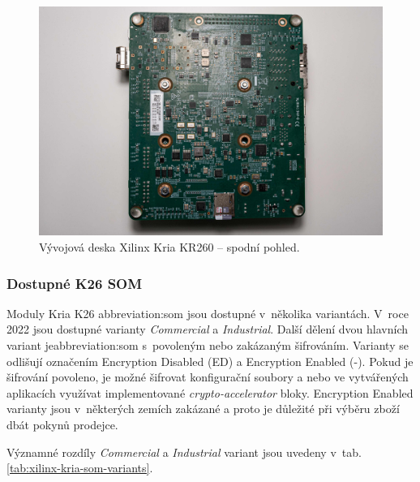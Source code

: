 \documentclass[a4paper, twoside, 11pt]{article}
\begin{document}
				\begin{figure}[H]
					\centering
						\includegraphics[width=1\textwidth]{src/jpg/xilinx-kria-foto-3.jpeg} 
						\caption{Vývojová deska Xilinx Kria KR260 – spodní pohled.}
						\label{fig:xilinx-kria-foto-3}
				\end{figure}
			
			
				\subsubsection{Dostupné K26 SOM}
					Moduly Kria K26 \gls{abbreviation:som} jsou dostupné v~několika variantách. V~roce 2022 jsou dostupné varianty \textit{Commercial} a \textit{Industrial}. Další dělení dvou hlavních variant je\gls{abbreviation:som} s~povoleným nebo zakázaným šifrováním. Varianty se odlišují označením Encryption Disabled (ED) a Encryption Enabled (-). Pokud je šifrování povoleno, je možné šifrovat konfigurační soubory a nebo ve vytvářených aplikacích využívat implementované \textit{crypto-accelerator} bloky. Encryption Enabled varianty jsou v~některých zemích zakázané a proto je důležité při výběru zboží dbát pokynů prodejce.
					\par Významné rozdíly \textit{Commercial} a \textit{Industrial} variant jsou uvedeny v~tab. \ref{tab:xilinx-kria-som-variants}.
\end{document}
